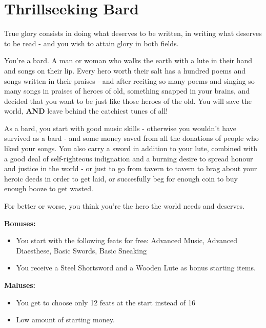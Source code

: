 \section{Thrillseeking Bard}
True glory consists in doing what deserves to be written, in writing what deserves to be read - and you wish to attain glory in both fields.

You're a bard. A man or woman who walks the earth with a lute in their hand and songs on their lip. Every hero worth their salt has a hundred poems and songs written in their praises - and after reciting so many poems and singing so many songs in praises of heroes of old, something snapped in your brains, and decided that you want to be just like those heroes of the old. You will save the world, \textbf{AND} leave behind the catchiest tunes of all!

As a bard, you start with good music skills - otherwise you wouldn't have survived as a bard - and some money saved from all the donations of people who liked your songs. You also carry a sword in addition to your lute, combined with a good deal of self-righteous indignation and a burning desire to spread honour and justice in the world - or just to go from tavern to tavern to brag about your heroic deeds  in order to get laid, or succesfully beg for enough coin to buy enough booze to get wasted.

For better or worse, you think you're the hero the world needs and deserves.

\textbf{Bonuses:}
\begin{itemize}
	\item You start with the following feats for free: Advanced Music, Advanced Diaesthese, Basic Swords, Basic Sneaking
	\item You receive a Steel Shortsword and a Wooden Lute as bonus starting items.
\end{itemize}


\textbf{Maluses:}
\begin{itemize}
	\item You get to choose only 12 feats at the start instead of 16
	\item Low amount of starting money.
\end{itemize}
